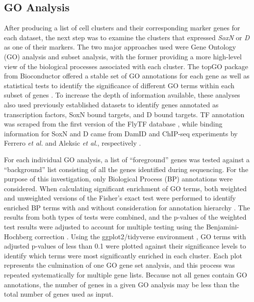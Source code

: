 \documentclass[withindex,glossary]{cam-thesis}
\begin{document}
\subsection{GO Analysis}

After producing a list of cell clusters and their corresponding marker
genes for each dataset, the next step was to examine the clusters that
expressed \emph{SoxN} or \emph{D} as one of their markers. The two major
approaches used were Gene Ontology (GO) analysis and subset analysis,
with the former providing a more high-level view of the biological
processes associated with each cluster. The topGO package from
Bioconductor offered a stable set of GO annotations for each gene as
well as statistical tests to identify the significance of different GO
terms within each subset of genes . To
increase the depth of information available, these analyses also used
previously established datasets to identify genes annotated as
transcription factors, SoxN bound targets, and D bound targets. TF
annotation was scraped from the first version of the FlyTF database
, while binding information for SoxN and D came from DamID and
ChIP-seq experiments by Ferrero \emph{et al.} and Aleksic \emph{et al}.,
respectively .

For each individual GO analysis, a list of ``foreground'' genes was
tested against a ``background'' list consisting of all the genes
identified during sequencing. For the purpose of this investigation,
only Biological Process (\gls{BP}) annotations were considered. When
calculating significant enrichment of GO terms, both weighted and
unweighted versions of the Fisher's exact test were performed to
identify enriched BP terms with and without consideration for annotation
hierarchy . The results from both types of tests
were combined, and the p-values of the weighted test results were
adjusted to account for multiple testing using the Benjamini-Hochberg
correction . Using
the ggplot2/tidyverse environment , GO terms with
adjusted p-values of less than 0.1 were plotted against their
significance levels to identify which terms were most significantly
enriched in each cluster. Each plot represents the culmination of one GO
gene set analysis, and this process was repeated systematically for
multiple gene lists. Because not all genes contain GO annotations, the
number of genes in a given GO analysis may be less than the total number
of genes used as input.
\end{document}
